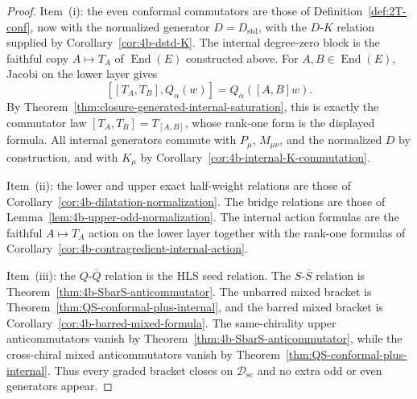 \begin{proof}
Item~\textnormal{(i)}: the even conformal commutators are those of
Definition~\ref{def:2T-conf}, now with the normalized generator
\(D=D_{\mathrm{std}}\), with the \(D\)-\(K\) relation supplied by
Corollary~\ref{cor:4b-dstd-K}. The internal degree-zero block is the faithful copy
\(A\mapsto T_A\) of \(\operatorname{End}(E)\) constructed above. For
\(A,B\in\operatorname{End}(E)\), Jacobi on the lower layer gives
\[
  [[T_A,T_B],Q_\alpha(w)]
  =
  Q_\alpha([A,B]w).
\]
By Theorem~\ref{thm:closure-generated-internal-saturation}, this is exactly the
commutator law \([T_A,T_B]=T_{[A,B]}\), whose rank-one form is the displayed
formula. All internal generators commute with \(P_\mu\), \(M_{\mu\nu}\), and the
normalized \(D\) by construction, and with \(K_\mu\) by
Corollary~\ref{cor:4b-internal-K-commutation}.

Item~\textnormal{(ii)}: the lower and upper exact half-weight relations are those
of Corollary~\ref{cor:4b-dilatation-normalization}. The bridge relations are
those of Lemma~\ref{lem:4b-upper-odd-normalization}. The internal action
formulas are the faithful \(A\mapsto T_A\) action on the lower layer together
with the rank-one formulas of
Corollary~\ref{cor:4b-contragredient-internal-action}.

Item~\textnormal{(iii)}: the \(Q\)-\(\bar Q\) relation is the HLS seed relation.
The \(S\)-\(\bar S\) relation is Theorem~\ref{thm:4b-SbarS-anticommutator}. The
unbarred mixed bracket is Theorem~\ref{thm:QS-conformal-plus-internal}, and the
barred mixed bracket is Corollary~\ref{cor:4b-barred-mixed-formula}. The
same-chirality upper anticommutators vanish by
Theorem~\ref{thm:4b-SbarS-anticommutator}, while the cross-chiral mixed
anticommutators vanish by Theorem~\ref{thm:QS-conformal-plus-internal}. Thus
every graded bracket closes on \(\mathcal D_{\mathrm{sc}}\) and no extra odd or
even generators appear.
\end{proof}

